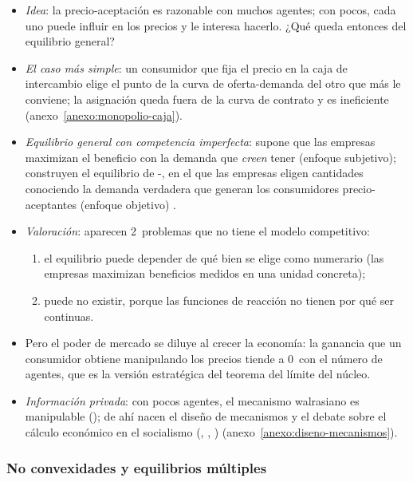 \documentclass[11pt]{article}
\begin{document}
\begin{itemize}
\item \emph{Idea}: la precio-aceptación es razonable con muchos agentes; con pocos, cada uno puede influir en los precios y le interesa hacerlo. ¿Qué queda entonces del equilibrio general?
\item \emph{El caso más simple}: un consumidor que fija el precio en la caja de intercambio elige el punto de la curva de oferta-demanda del otro que más le conviene; la asignación queda fuera de la curva de contrato y es ineficiente (anexo~\ref{anexo:monopolio-caja}).
\item \emph{Equilibrio general con competencia imperfecta}: \textcite{Negishi1961Monopolistic} supone que las empresas maximizan el beneficio con la demanda que \emph{creen} tener (enfoque subjetivo); \textcite{GabszewiczVial1972Oligopoly} construyen el equilibrio de -, en el que las empresas eligen cantidades conociendo la demanda verdadera que generan los consumidores precio-aceptantes (enfoque objetivo) .
\item \emph{Valoración}: aparecen 2~problemas que no tiene el modelo competitivo:
  \begin{enumerate}
  \item el equilibrio puede depender de qué bien se elige como numerario (las empresas maximizan beneficios medidos en una unidad concreta);
  \item puede no existir, porque las funciones de reacción no tienen por qué ser continuas\nocite{RobertsSonnenschein1977Foundations}.
  \end{enumerate}
\item Pero el poder de mercado se diluye al crecer la economía: la ganancia que un consumidor obtiene manipulando los precios tiende a 0~con el número de agentes\nocite{RobertsPostlewaite1976Incentives}, que es la versión estratégica del teorema del límite del núcleo.
\end{itemize}


\begin{itemize}
\item \emph{Información privada}: con pocos agentes, el mecanismo walrasiano es manipulable (); de ahí nacen el diseño de mecanismos y el debate sobre el cálculo económico en el socialismo (, , ) (anexo~\ref{anexo:diseno-mecanismos}).
\end{itemize}

\subsubsection{No convexidades y equilibrios múltiples}\label{sec:no-convexidades-equilibrios}
\end{document}
